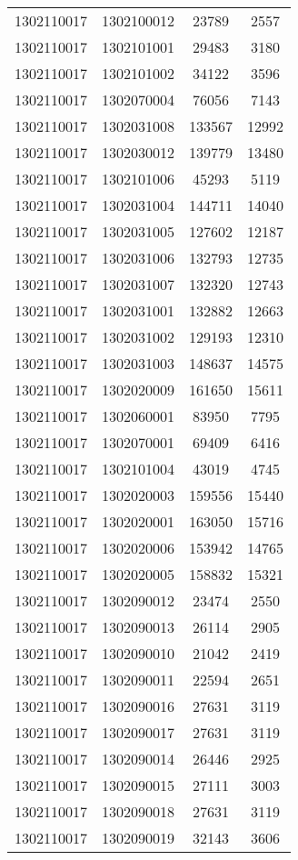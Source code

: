 \begin{longtable}{llcc}
1302110017 & 1302100012 & 23789 & 2557\\
1302110017 & 1302101001 & 29483 & 3180\\
1302110017 & 1302101002 & 34122 & 3596\\
1302110017 & 1302070004 & 76056 & 7143\\
1302110017 & 1302031008 & 133567 & 12992\\
1302110017 & 1302030012 & 139779 & 13480\\
1302110017 & 1302101006 & 45293 & 5119\\
1302110017 & 1302031004 & 144711 & 14040\\
1302110017 & 1302031005 & 127602 & 12187\\
1302110017 & 1302031006 & 132793 & 12735\\
1302110017 & 1302031007 & 132320 & 12743\\
1302110017 & 1302031001 & 132882 & 12663\\
1302110017 & 1302031002 & 129193 & 12310\\
1302110017 & 1302031003 & 148637 & 14575\\
1302110017 & 1302020009 & 161650 & 15611\\
1302110017 & 1302060001 & 83950 & 7795\\
1302110017 & 1302070001 & 69409 & 6416\\
1302110017 & 1302101004 & 43019 & 4745\\
1302110017 & 1302020003 & 159556 & 15440\\
1302110017 & 1302020001 & 163050 & 15716\\
1302110017 & 1302020006 & 153942 & 14765\\
1302110017 & 1302020005 & 158832 & 15321\\
1302110017 & 1302090012 & 23474 & 2550\\
1302110017 & 1302090013 & 26114 & 2905\\
1302110017 & 1302090010 & 21042 & 2419\\
1302110017 & 1302090011 & 22594 & 2651\\
1302110017 & 1302090016 & 27631 & 3119\\
1302110017 & 1302090017 & 27631 & 3119\\
1302110017 & 1302090014 & 26446 & 2925\\
1302110017 & 1302090015 & 27111 & 3003\\
1302110017 & 1302090018 & 27631 & 3119\\
1302110017 & 1302090019 & 32143 & 3606\\

\end{longtable}
